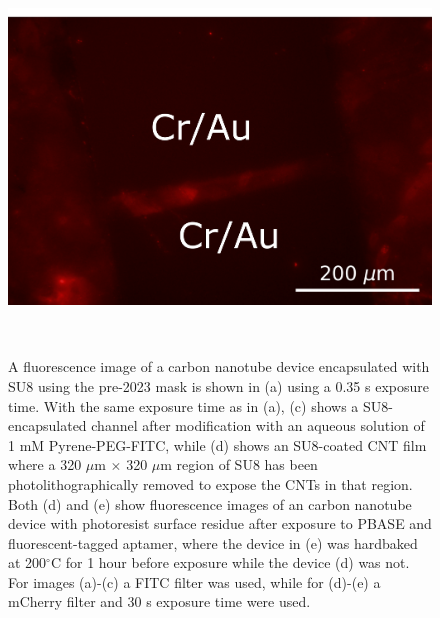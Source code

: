 \documentclass[
  a4paper,
]{scrbook}
\begin{document}
\begin{figure}
\begin{minipage}[t]{0.47\linewidth}
{{\includegraphics{figures/ch6/modified_hardbake_aptamer_ch3_mCherry_30sexposure_highcontrast_ISO200_12.6X.png}

}

}

\subcaption{\label{fig-aptamer-photoresist-2}}
\end{minipage}%
%
\begin{minipage}[t]{0.26\linewidth}

{\centering 

~

}

\end{minipage}%

\caption{\label{fig-FITC-SU8}A fluorescence image of a carbon nanotube
device encapsulated with SU8 using the pre-2023 mask is shown in (a)
using a 0.35 s exposure time. With the same exposure time as in (a), (c)
shows a SU8-encapsulated channel after modification with an aqueous
solution of 1 mM Pyrene-PEG-FITC, while (d) shows an SU8-coated CNT film
where a 320 \(\mu\)m \(\times\) 320 \(\mu\)m region of SU8 has been
photolithographically removed to expose the CNTs in that region. Both
(d) and (e) show fluorescence images of an carbon nanotube device with
photoresist surface residue after exposure to PBASE and
fluorescent-tagged aptamer, where the device in (e) was hardbaked at
200\(^\circ\)C for 1 hour before exposure while the device (d) was not.
For images (a)-(c) a FITC filter was used, while for (d)-(e) a mCherry
filter and 30 s exposure time were used.}

\end{figure}
\end{document}
